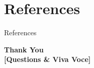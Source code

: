 \documentclass[aspectratio=169, 11pt]{beamer}
\begin{document}
\section{References}
\nocite{*}
\begin{frame}[allowframebreaks]{References}
    
    
\end{frame}

\begin{frame}
    \centering
    {\Huge \textbf{\textcolor{amritaMaroon}{Thank You}}} \\[0.4cm]
    {\large \textbf{[Questions \& Viva Voce]}}
\end{frame}
\end{document}
